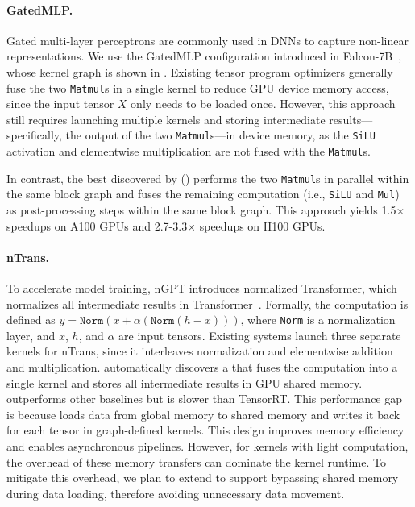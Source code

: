 \paragraph{GatedMLP.}
Gated multi-layer perceptrons are commonly used in DNNs to capture non-linear representations.
%
We use the GatedMLP configuration introduced in Falcon-7B~\cite{falcon40b}, whose kernel graph is shown in .
Existing tensor program optimizers generally fuse the two {\tt Matmul}s in a single kernel to reduce GPU device memory access, since the input tensor $X$ only needs to be loaded once.
%
However, this approach still requires launching multiple kernels and storing intermediate results---specifically, the output of the two {\tt Matmul}s---in device memory, as the {\tt SiLU} activation and elementwise multiplication are not fused with the {\tt Matmul}s. 
%

In contrast, the best \graph discovered by \sys () performs the two {\tt Matmul}s in parallel within the same block graph and fuses the remaining computation (i.e., {\tt SiLU} and {\tt Mul}) as post-processing steps within the same block graph. This approach yields 1.5$\times$ speedups on A100 GPUs and 2.7-3.3$\times$ speedups on H100 GPUs.

%

\paragraph{nTrans.}
To accelerate model training, nGPT introduces normalized Transformer, which normalizes all intermediate results in Transformer~\cite{loshchilov2024ngpt}. Formally, the computation is defined as $y = \texttt{Norm}(x + \alpha (\texttt{Norm}(h - x)))$, where {\tt Norm} is a normalization layer, and $x$, $h$, and $\alpha$ are input tensors. Existing systems launch three separate kernels for nTrans, since it interleaves normalization and elementwise addition and multiplication. \Sys automatically discovers a \graph that fuses the computation into a single kernel and stores all intermediate results in GPU shared memory. \Sys outperforms other baselines but is slower than TensorRT. This performance gap is because \Sys loads data from global memory to shared memory and writes it back for each tensor in graph-defined kernels. This design improves memory efficiency and enables asynchronous pipelines. However, for kernels with light computation, the overhead of these memory transfers can dominate the kernel runtime. 
To mitigate this overhead, we plan to extend \sys to support bypassing shared memory during data loading, therefore avoiding unnecessary data movement.

